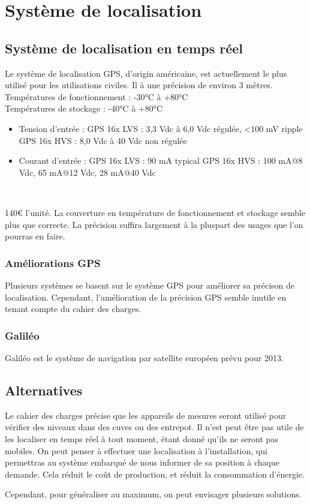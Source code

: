 \section{Système de localisation}

    \subsection{Système de localisation en temps réel}
            {Le système de localisation GPS, d'origin américaine, est actuellement le plus utilisé pour les utilisations civiles.
            Il à une précision de environ 3 mêtres.}
            {Températures de fonctionnement : -30°C à +80°C\\
                      Températures de stockage : -40°C à +80°C}
            {\begin{itemize}
                \item Tension d'entrée :
                    \subitem GPS 16x LVS : 3,3 Vdc à 6,0 Vdc régulée, <100 mV ripple
                    \subitem GPS 16x HVS : 8,0 Vdc à 40 Vdc non régulée
                \item Courant d'entrée :
                    \subitem GPS 16x LVS : 90 mA typical
                    \subitem GPS 16x HVS : 100 mA@8 Vdc, 65 mA@12 Vdc, 28 mA@40 Vdc
             \end{itemize}~}
            {140€ l'unité.}
            {}
            {La couverture en température de fonctionnement et stockage semble plus que correcte. La précision suffira largement à la pluspart des usages que l'on pourras en faire.}
	        
	    \subsubsection{Améliorations GPS}
	        Plusieurs systèmes se basent sur le système GPS pour améliorer sa précison de localisation.
	        Cependant, l'amélioration de la précision GPS semble inutile en tenant compte du cahier des charges.

        \subsubsection{Galiléo}
	        Galiléo est le système de navigation par satellite européen prévu pour 2013.
	        
    \subsection{Alternatives}
        Le cahier des charges précise que les appareils de mesures seront utilisé pour vérifier des niveaux dans des cuves ou des entrepot.
        Il n'est peut être pas utile de les localiser en temps réel à tout moment, étant donné qu'ils ne seront pas mobiles.
        On peut penser à effectuer une localisation à l'installation, qui permettras au système embarqué de nous informer de sa position à chaque demande.
        Cela réduit le coût de production, et réduit la consommation d'énergie.
        
        Cependant, pour généraliser au maximum, on peut envisager plusieurs solutions.
